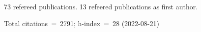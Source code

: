 73 refereed publications. 13 refeered publications as first author.

Total citations~=~2791; h-index~=~28 (2022-08-21)